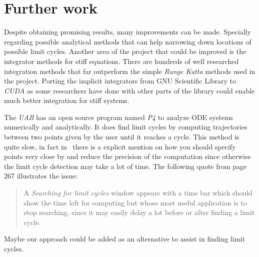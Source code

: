 %
\section{Further work}%
\label{sec:future}

Despite obtaining promising results, many improvements can be made. Specially
regarding possible analytical methods that can help narrowing down locations of
possible limit cycles. Another area of the project that could be improved is the
integrator methods for stiff equations.
There are hundreds of well researched integration methods that far outperform the
simple \emph{Runge Kutta} methods used in the project.
Porting the implicit integrators from GNU Scientific Library to \emph{CUDA}
as some researchers have done with other parts of the library \cite{rodrigo_gnu_2019}
could enable much better integration for stiff systems.


The \emph{UAB} has an open source program named \emph{P4}
\cite{saleta_oscarsaletap4_2018,saleta_computer_2018} to analyze ODE systems
numerically and analytically. It does find limit cycles by computing
trajectories between two points given by the user until it reaches a cycle. This
method is quite slow, in fact in~\cite{dumortier_examples_2006} there is a
explicit mention on how you should specify points very close by and reduce the
precision of the computation since otherwise the limit cycle detection may take
a lot of time. The following quote from page 267 illustrates the issue:

\begin{quote}
    A \emph{Searching for limit cycles} window  appears  with  a  time  bar
    which  should show the time left for computing but whose most useful
    application is to stop searching, since it may easily delay a lot before or
    after finding a limit cycle.
\end{quote}

Maybe our approach could be added as an alternative to assist in finding limit cycles.
